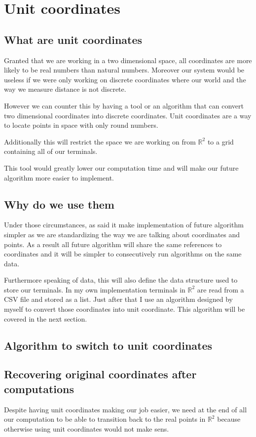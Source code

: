 \chapter{Unit coordinates}
\section{What are unit coordinates}%
	Granted that we are working in a two dimensional space, all coordinates are more likely to be real numbers than natural numbers.
	Moreover our system would be useless if we were only working on discrete coordinates where our world and the way we measure distance is not discrete.
	
	However we can counter this by having a tool or an algorithm that can convert two dimensional coordinates into discrete coordinates. Unit coordinates are a way to locate points in space with only round numbers.
	
	Additionally this will restrict the space we are working on from $\mathbb{R}^2$ to a grid containing all of our terminals.
	
	This tool would greatly lower our computation time and will make our future algorithm more easier to implement.
\section{Why do we use them}%
	Under those circumstances, as said it make implementation of future algorithm simpler as we are standardizing the way we are talking about coordinates and points. As a result all future algorithm will share the same references to coordinates and it will be simpler to consecutively run algorithms on the same data.
	
	Furthermore speaking of data, this will also define the data structure used to store our terminals. In my own implementation terminals in $\mathbb{R}^2$ are read from a CSV file and stored as a list. Just after that I use an algorithm designed by myself to convert those coordinates into unit coordinate. This algorithm will be covered in the next section. 
\section{Algorithm to switch to unit coordinates}%

\section{Recovering original coordinates after computations}%
Despite having unit coordinates making our job easier, we need at the end of all our computation to be able to transition back to the real points in $\mathbb{R}^2$ because otherwise using unit coordinates would not make sens.

